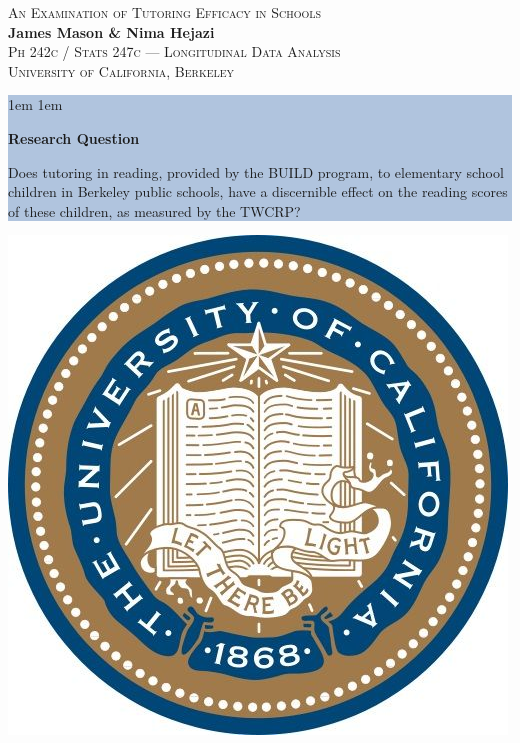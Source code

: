 \documentclass[a0,landscape]{a0poster}
\begin{document}


\begin{minipage}[b]{0.53\linewidth}
\Huge{\color{NavyBlue} \scshape An Examination of Tutoring Efficacy in Schools} \\ %
\huge\textbf{James Mason \& Nima Hejazi}\\ %
\Large{\scshape Ph 242c / Stats 247c --- Longitudinal Data Analysis} \\ %
\LARGE{\scshape University of California, Berkeley}\\ %
\end{minipage}%
%
\colorbox{LightSteelBlue}{\begin{minipage}[b]{0.35\linewidth}
        \vspace{2ex}
        \leftskip 1em \rightskip 1em
        \begin{center}
        {\color{Black} \LARGE \bfseries Research Question}
        \end{center}
          
        \Large
        Does tutoring in reading, provided by the BUILD program,
        to elementary school children in Berkeley public schools,
        have a discernible effect on the reading scores of
        these children, as measured by the TWCRP?
        \vspace{2ex}
\end{minipage}}
\hfill
\includegraphics[scale=0.5]{logo_cal.jpg} 
\end{document}
